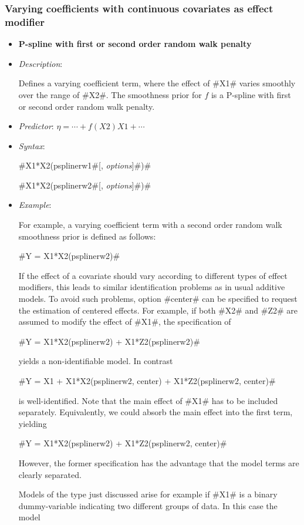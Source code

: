 \subsubsection*{Varying coefficients with continuous covariates as
effect modifier}

\begin{itemize}
\item[]{\bf\sffamily P-spline with first or second order random
walk penalty}

\item[] {\em Description}:

Defines a varying coefficient term, where the effect of #X1#
varies smoothly over the range of #X2#. The smoothness prior for
$f$ is a P-spline with first or second order random walk penalty.
\item[] {\em Predictor}: $\eta= \cdots + f(X2)X1 + \cdots$ \item[]
{\em Syntax}:

#X1*X2(psplinerw1#[, {\em options}]#)#

#X1*X2(psplinerw2#[, {\em options}]#)#
\item[] {\em Example}:

For example, a varying coefficient term with a second order random
walk smoothness prior is defined as follows:

#Y = X1*X2(psplinerw2)#

If the effect of a covariate should vary according to different
types of effect modifiers, this leads to similar identification
problems as in usual additive models. To avoid such problems,
option #center# can be specified to request the estimation of
centered effects. For example, if both #X2# and #Z2# are assumed
to modify the effect of #X1#, the specification of

#Y = X1*X2(psplinerw2) + X1*Z2(psplinerw2)#

yields a non-identifiable model. In contrast

#Y = X1 + X1*X2(psplinerw2, center) + X1*Z2(psplinerw2, center)#

is well-identified. Note that the main effect of #X1# has to be
included separately. Equivalently, we could absorb the main effect
into the first term, yielding

#Y = X1*X2(psplinerw2) + X1*Z2(psplinerw2, center)#

However, the former specification has the advantage that the model
terms are clearly separated.

Models of the type just discussed arise for example if #X1# is a
binary dummy-variable indicating two different groups of data. In
this case the model


\end{itemize}
